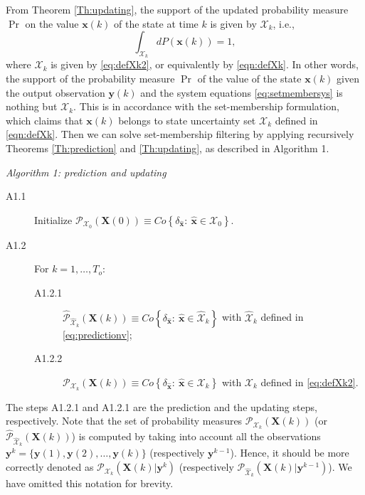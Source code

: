 \documentclass[twocolumn]{autart}
\begin{document}
From Theorem \ref{Th:updating}, the support of the updated probability measure $\Pr$ on the value $\mathbf{x}(k)$ of the state at time $k$ is given by ${\mathcal{X}_{k}}$, i.e.,
 \begin{equation}
 \int_{{\mathcal{X}_{k}}}dP(\mathbf{x}(k))=1,
 \end{equation}
 where ${\mathcal{X}_{k}}$  is given by \eqref{eq:defXk2}, or  equivalently by \eqref{eqn:defXk}. In other words,  the support of the probability measure  $\Pr$ of the value of the state $\mathbf{x}(k)$ given the output observation $\mathbf{y}(k)$ and the system equations \eqref{eq:setmembersys} is nothing but ${\mathcal{X}_{k}}$.    This is in accordance with the set-membership formulation, which claims that  $\mathbf{x}(k)$ belongs to state uncertainty set  ${\mathcal{X}_{k}}$ defined in \eqref{eqn:defXk}.
 Then we can solve set-membership filtering by applying recursively  Theorems \ref{Th:prediction} and \ref{Th:updating}, as described in Algorithm 1.
 \begin{algorithm} \emph{Algorithm 1: prediction and updating}  \\
\begin{description}
  \item[A1.1] Initialize $\mathcal{P}_{\mathcal{X}_0}(\mathbf{X}(0))\equiv Co\left\{\delta_{\hat{\mathbf{x}}}:~\hat{\mathbf{x}}\in  \mathcal{X}_0\right\}$.
  \item[A1.2] For $k=1,\dots,T_o$:
  \begin{description}
  \item[A1.2.1]  $\hat{\mathcal{P}}_{\hat{\mathcal{X}}_k}(\mathbf{X}(k))\equiv Co\left\{\delta_{\hat{\mathbf{x}}}:~\hat{\mathbf{x}}\in  {\hat{\mathcal{X}}_k}\right\}$ with
  $\hat{\mathcal{X}}_k$ defined in \eqref{eq:predictionv};
    \item[A1.2.2]  $\mathcal{P}_{\mathcal{X}_k}(\mathbf{X}(k))\equiv Co\left\{\delta_{\hat{\mathbf{x}}}:~\hat{\mathbf{x}}\in  \mathcal{X}_k\right\}$ with
  $\mathcal{X}_k$ defined in \eqref{eq:defXk2}.
  \end{description}
\end{description}
\end{algorithm}
The steps A1.2.1 and A1.2.1 are  the prediction and the updating steps, respectively.
Note that the set of probability measures  $\mathcal{P}_{\mathcal{X}_k}(\mathbf{X}(k))$ (or 
$\hat{\mathcal{P}}_{\hat{\mathcal{X}}_k}(\mathbf{X}(k))$) is computed by taking into account all the observations  
$\mathbf{y}^{k}=\{\mathbf{y}(1),\mathbf{y}(2),\dots,\mathbf{y}(k)\}$ (respectively $\mathbf{y}^{k-1}$).
Hence, it should be more correctly denoted as $\mathcal{P}_{\mathcal{X}_k}(\mathbf{X}(k)|\mathbf{y}^{k})$ (respectively $\mathcal{P}_{\hat{\mathcal{X}}_k}(\mathbf{X}(k)|\mathbf{y}^{k-1})$). We have omitted this  notation for brevity.
\end{document}
